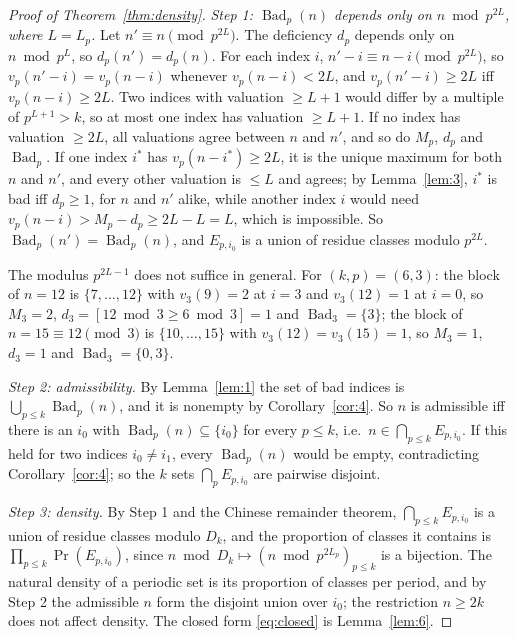 \documentclass[11pt]{amsart}
\theoremstyle{remark}
\DeclareMathOperator{\Bad}{Bad}
\renewcommand{\Pr}{\operatorname{Pr}}
\begin{document}
\begin{proof}[Proof of Theorem~\ref{thm:density}]
\emph{Step 1: $\Bad_p(n)$ depends only on $n\bmod p^{2L}$, where $L=L_p$.} Let $n'\equiv n\pmod{p^{2L}}$. The deficiency $d_p$ depends only on $n\bmod p^L$, so $d_p(n')=d_p(n)$. For each index $i$, $n'-i\equiv n-i\pmod{p^{2L}}$, so $v_p(n'-i)=v_p(n-i)$ whenever $v_p(n-i)<2L$, and $v_p(n'-i)\ge2L$ iff $v_p(n-i)\ge2L$. Two indices with valuation $\ge L+1$ would differ by a multiple of $p^{L+1}>k$, so at most one index has valuation $\ge L+1$. If no index has valuation $\ge2L$, all valuations agree between $n$ and $n'$, and so do $M_p$, $d_p$ and $\Bad_p$. If one index $i^*$ has $v_p(n-i^*)\ge2L$, it is the unique maximum for both $n$ and $n'$, and every other valuation is $\le L$ and agrees; by Lemma~\ref{lem:3}, $i^*$ is bad iff $d_p\ge1$, for $n$ and $n'$ alike, while another index $i$ would need $v_p(n-i)>M_p-d_p\ge2L-L=L$, which is impossible. So $\Bad_p(n')=\Bad_p(n)$, and $E_{p,i_0}$ is a union of residue classes modulo $p^{2L}$.

The modulus $p^{2L-1}$ does not suffice in general. For $(k,p)=(6,3)$: the block of $n=12$ is $\{7,\dots,12\}$ with $v_3(9)=2$ at $i=3$ and $v_3(12)=1$ at $i=0$, so $M_3=2$, $d_3=[12\bmod3\ge6\bmod3]=1$ and $\Bad_3=\{3\}$; the block of $n=15\equiv12\pmod3$ is $\{10,\dots,15\}$ with $v_3(12)=v_3(15)=1$, so $M_3=1$, $d_3=1$ and $\Bad_3=\{0,3\}$.

\emph{Step 2: admissibility.} By Lemma~\ref{lem:1} the set of bad indices is $\bigcup_{p\le k}\Bad_p(n)$, and it is nonempty by Corollary~\ref{cor:4}. So $n$ is admissible iff there is an $i_0$ with $\Bad_p(n)\subseteq\{i_0\}$ for every $p\le k$, i.e.\ $n\in\bigcap_{p\le k}E_{p,i_0}$. If this held for two indices $i_0\ne i_1$, every $\Bad_p(n)$ would be empty, contradicting Corollary~\ref{cor:4}; so the $k$ sets $\bigcap_pE_{p,i_0}$ are pairwise disjoint.

\emph{Step 3: density.} By Step 1 and the Chinese remainder theorem, $\bigcap_{p\le k}E_{p,i_0}$ is a union of residue classes modulo $D_k$, and the proportion of classes it contains is $\prod_{p\le k}\Pr(E_{p,i_0})$, since $n\bmod D_k\mapsto(n\bmod p^{2L_p})_{p\le k}$ is a bijection. The natural density of a periodic set is its proportion of classes per period, and by Step 2 the admissible $n$ form the disjoint union over $i_0$; the restriction $n\ge2k$ does not affect density. The closed form \eqref{eq:closed} is Lemma~\ref{lem:6}.
\end{proof}
\end{document}
